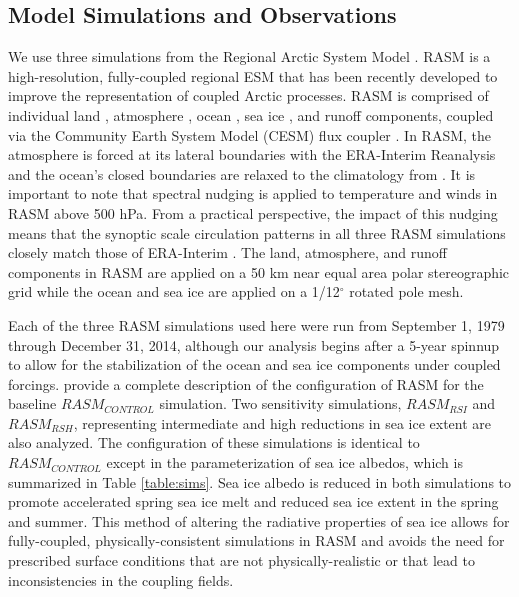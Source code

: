 \subsection{Model Simulations and Observations}
We use three simulations from the Regional Arctic System Model \citep[RASM;][]{Hamman_2016a,Roberts_2015a}.
RASM is a high-resolution, fully-coupled regional ESM that has been recently developed to improve the representation of coupled Arctic processes.
RASM is comprised of individual land \citep[see][]{Hamman_2016a}, atmosphere \citep[see][]{Cassano_2016}, ocean \citep[see][]{Roberts_2015a}, sea ice \citep[see][]{Roberts_2015a}, and runoff \citep[see][]{Hamman_2016b} components, coupled via the Community Earth System Model (CESM) flux coupler \citep{Craig_2012}.
In RASM, the atmosphere is forced at its lateral boundaries with the ERA-Interim Reanalysis \citep{Dee_2011} and the ocean's closed boundaries are relaxed to the climatology from \citet{Steele_2001}.
It is important to note that spectral nudging is applied to temperature and winds in RASM above 500 hPa.
From a practical perspective, the impact of this nudging means that the synoptic scale circulation patterns in all three RASM simulations closely match those of ERA-Interim \citep{Glisan_2013}.
The land, atmosphere, and runoff components in RASM are applied on a 50 km near equal area polar stereographic grid while the ocean and sea ice are applied on a 1/12$^{\circ}$ rotated pole mesh.

Each of the three RASM simulations used here were run from September 1, 1979 through December 31, 2014, although our analysis begins after a 5-year spinnup to allow for the stabilization of the ocean and sea ice components under coupled forcings.
\citet{Hamman_2016b} provide a complete description of the configuration of RASM for the baseline $RASM_{CONTROL}$ simulation.
Two sensitivity simulations, $RASM_{RSI}$ and $RASM_{RSH}$, representing intermediate and high reductions in sea ice extent are also analyzed.
The configuration of these simulations is identical to $RASM_{CONTROL}$ except in the parameterization of sea ice albedos, which is summarized in Table \ref{table:sims}.
Sea ice albedo is reduced in both simulations to promote accelerated spring sea ice melt and reduced sea ice extent in the spring and summer.
This method of altering the radiative properties of sea ice allows for fully-coupled, physically-consistent simulations in RASM and avoids the need for prescribed surface conditions that are not physically-realistic or that lead to inconsistencies in the coupling fields.

